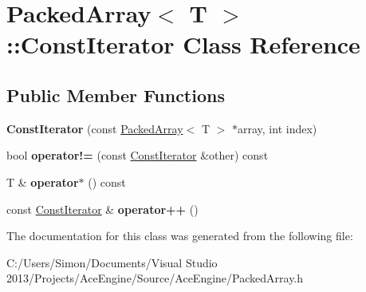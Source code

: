 \hypertarget{class_packed_array_1_1_const_iterator}{}\section{Packed\+Array$<$ T $>$\+:\+:Const\+Iterator Class Reference}
\label{class_packed_array_1_1_const_iterator}
\subsection*{Public Member Functions}
\begin{DoxyCompactItemize}
\item 
\hypertarget{class_packed_array_1_1_const_iterator_aaeaf61f1bafc89f343f00165e7c347e8}{}{\bfseries Const\+Iterator} (const \hyperlink{class_packed_array}{Packed\+Array}$<$ T $>$ $\ast$array, int index)\label{class_packed_array_1_1_const_iterator_aaeaf61f1bafc89f343f00165e7c347e8}

\item 
\hypertarget{class_packed_array_1_1_const_iterator_ab32cda8a1bbe7bb5b9b0e07e63751bf3}{}bool {\bfseries operator!=} (const \hyperlink{class_packed_array_1_1_const_iterator}{Const\+Iterator} \&other) const \label{class_packed_array_1_1_const_iterator_ab32cda8a1bbe7bb5b9b0e07e63751bf3}

\item 
\hypertarget{class_packed_array_1_1_const_iterator_af5d673ef73fab9a41d81c113517428db}{}T \& {\bfseries operator$\ast$} () const \label{class_packed_array_1_1_const_iterator_af5d673ef73fab9a41d81c113517428db}

\item 
\hypertarget{class_packed_array_1_1_const_iterator_abab1d92f9d0c129e1d9d7b91ced13f3b}{}const \hyperlink{class_packed_array_1_1_const_iterator}{Const\+Iterator} \& {\bfseries operator++} ()\label{class_packed_array_1_1_const_iterator_abab1d92f9d0c129e1d9d7b91ced13f3b}

\end{DoxyCompactItemize}


The documentation for this class was generated from the following file\+:\begin{DoxyCompactItemize}
\item 
C\+:/\+Users/\+Simon/\+Documents/\+Visual Studio 2013/\+Projects/\+Ace\+Engine/\+Source/\+Ace\+Engine/Packed\+Array.\+h\end{DoxyCompactItemize}

